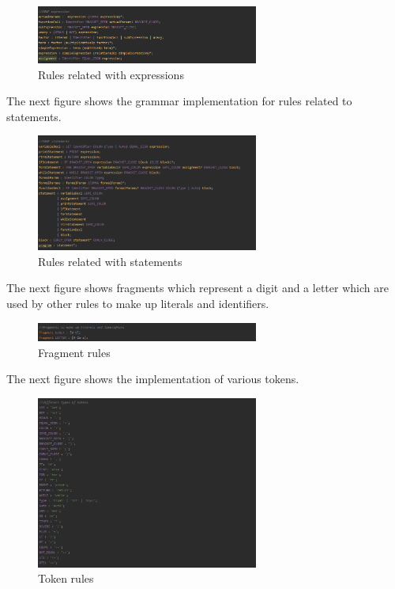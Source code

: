 \documentclass{article}
\begin{document}
						\begin{figure}[H]
					\centering
			 			\includegraphics[width=0.65\textwidth]{antlrv1_3.png}
			  			\caption{Rules related with expressions}
			  			\label{fig:antlrv1_3}
					\end{figure}
					
					\noindent The next figure shows the grammar implementation for rules related to statements.
			
						\begin{figure}[H]
					\centering
			 			\includegraphics[width=0.65\textwidth]{antlrv1_4.png}
			  			\caption{Rules related with statements}
			  			\label{fig:antlrv1_4}
					\end{figure}
					
					\noindent The next figure shows fragments which represent a digit and a letter which are used by other rules to make up literals and identifiers.
				
			
						\begin{figure}[H]
					\centering
			 			\includegraphics[width=0.65\textwidth]{antlrv1_5.png}
			  			\caption{Fragment rules}
			  			\label{fig:antlrv1_5}
					\end{figure}
					
					\noindent The next figure shows the implementation of various tokens.
				
						\begin{figure}[H]
					\centering
			 			\includegraphics[width=0.65\textwidth]{antlrv1_6.png}
			  			\caption{Token rules}
			  			\label{fig:antlrv1_6}
					\end{figure}
					
\end{document}
